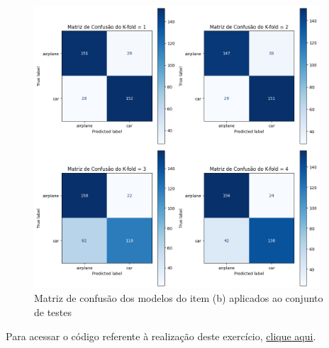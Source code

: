 \documentclass[]{abntex2}
\begin{document}
\begin{figure}[H]
    \centering 
    \includegraphics[width=0.95\textwidth]{imgs/ex3/conf4.png}
    \caption{Matriz de confusão dos modelos do item (b) aplicados ao conjunto de testes}
    \label{fig:conf4} %
\end{figure}

Para acessar o código referente à realização deste exercício, \href{https://github.com/lorran-araujo/LNCC/blob/main/disciplinas/redes-neurais/codes/lista3/exercicio3.ipynb}{clique aqui}.


\end{document}
